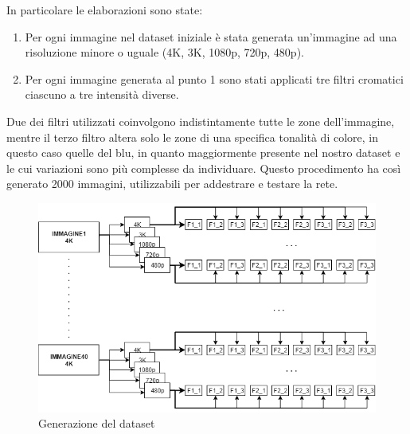 \documentclass[a4paper,11pt]{article}
\begin{document}
    In particolare le elaborazioni sono state:
    \begin{enumerate}
        \item Per ogni immagine nel dataset iniziale è stata generata un'immagine ad una risoluzione minore o uguale (4K, 3K, 1080p, 720p, 480p).
        \item Per ogni immagine generata al punto 1 sono stati applicati tre filtri cromatici ciascuno a tre intensità diverse.
    \end{enumerate}
    Due dei filtri utilizzati coinvolgono indistintamente tutte le zone dell'immagine, mentre il terzo filtro altera solo le zone di una specifica tonalità di colore, in questo caso quelle del blu, in quanto maggiormente presente nel nostro dataset e le cui variazioni sono più complesse da individuare. 
    Questo procedimento ha così generato 2000 immagini, utilizzabili per addestrare e testare la rete.
    
    \begin{figure}[h]
        \centering
        \includegraphics[scale=0.55]{generazione.png}
        \caption{Generazione del dataset}
    \end{figure}
    \newpage
\end{document}
